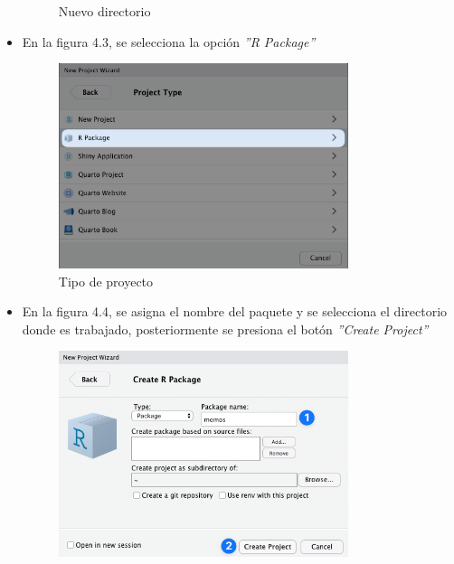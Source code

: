 \begin{itemize}
\begin{figure}[H]
\begin{minipage}{0.8\textwidth}
            \caption{Nuevo directorio}
            \label{fig:descripcion}
          \end{minipage}%
          \hspace{5mm}
    \end{figure}
    \item En la figura 4.3, se selecciona la opci\'on \textit{''R Package''}
    \begin{figure}[H]
        \centering
          \begin{minipage}{0.8\textwidth}
            \centering
            \includegraphics[width=0.8\textwidth]{figure_4_3.png}
            \caption{Tipo de proyecto}
            \label{fig:descripcion}
          \end{minipage}%
          \hspace{5mm}
    \end{figure}
    \item En la figura 4.4, se asigna el nombre del paquete y se selecciona el directorio donde es trabajado, posteriormente se presiona el bot\'on \textit{''Create Project''}
    \begin{figure}[H]
        \centering
          \begin{minipage}{0.8\textwidth}
            \centering
            \includegraphics[width=0.8\textwidth]{figure_4_4.png}

\end{minipage}
\end{figure}
\end{itemize}
